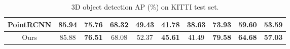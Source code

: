 \documentclass[letterpaper, 10 pt, conference]{ieeeconf}
\begin{document}
\begin{table*}[h]
\begin{center}
\begin{tabular}{c|ccc|ccc|ccc}
			PointRCNN\cite{shi2018pointrcnn}
			                                & \textbf{85.94}            & 75.76                            & \textbf{68.32}               & 49.43          & 41.78          & 38.63          & 73.93          & 59.60          & 53.59          \\ \hline
			Ours                            & 85.88                     & \textbf{76.51}                   & 68.08                        & 52.37          & \textbf{45.61} & 41.49          & \textbf{79.58} & \textbf{64.68} & \textbf{57.03} \\ \hline
		\end{tabular}
		\caption{3D object detection AP (\%) on KITTI test set.}
		\label{Tab:KITTI_TEST_3D}
	\end{center}
	\vspace{-0.5cm}
\end{table*}
\end{document}
